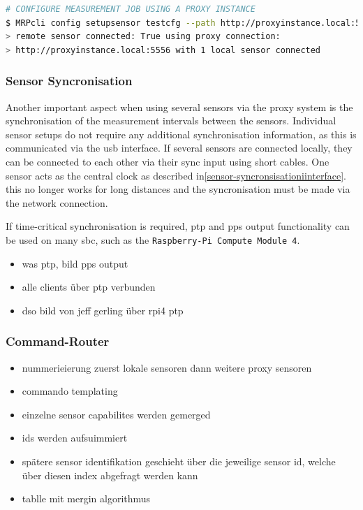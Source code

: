 \begin{lstlisting}[language=bash, caption={MRPcli usage example to connect with a network sensor}, label=lst:mrpcli_config_using_rpc]
# CONFIGURE MEASUREMENT JOB USING A PROXY INSTANCE
$ MRPcli config setupsensor testcfg --path http://proxyinstance.local:5556
> remote sensor connected: True using proxy connection:
> http://proxyinstance.local:5556 with 1 local sensor connected
\end{lstlisting}

\hypertarget{sensor-syncronisation}{%
\subsubsection{Sensor Syncronisation}\label{sensor-syncronisation}}

Another important aspect when using several sensors via the proxy system
is the synchronisation of the measurement intervals between the sensors.
Individual sensor setups do not require any additional synchronisation
information, as this is communicated via the \gls{usb} interface. If
several sensors are connected locally, they can be connected to each
other via their sync input using short cables. One sensor acts as the
central clock as described in\ref{sensor-syncronsisationiinterface}.
this no longer works for long distances and the syncronisation must be
made via the network connection.

If time-critical synchronisation is required, \gls{ptp} and \gls{pps}
output functionality can be used on many \gls{sbc}, such as the
\passthrough{\lstinline!Raspberry-Pi Compute Module 4!}.

\begin{itemize}
\tightlist
\item
  was ptp, bild pps output
\item
  alle clients über ptp verbunden
\item
  dso bild von jeff gerling über rpi4 ptp
\end{itemize}

\hypertarget{command-router}{%
\subsubsection{Command-Router}\label{command-router}}

\begin{itemize}
\item
  nummerieierung zuerst lokale sensoren dann weitere proxy sensoren
\item
  commando templating
\item
  einzelne sensor capabilites werden gemerged
\item
  ids werden aufsuimmiert
\item
  spätere sensor identifikation geschieht über die jeweilige sensor id,
  welche über diesen index abgefragt werden kann
\item
  tablle mit mergin algorithmus
\end{itemize}

